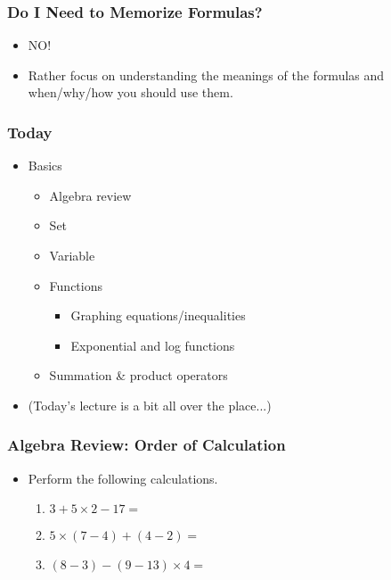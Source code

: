 \documentclass[pdflatex, 12pt]{beamer}
\begin{document}
\begin{frame}
\frametitle{Do I Need to Memorize Formulas?}
\begin{itemize}
\item NO!
\vspace{0.4cm}
\item Rather focus on understanding the meanings of the formulas and when/why/how you should use them.
\end{itemize}
\end{frame}

\begin{frame}
\frametitle{Today}
\begin{itemize}
\item Basics
 \begin{itemize}
 \item Algebra review
 \item Set
 \item Variable
 \item Functions
  \begin{itemize}
  \item Graphing equations/inequalities
  \item Exponential and log functions
  \end{itemize}
 \item Summation \& product operators
 \end{itemize}
\vspace{0.4cm}
\item (Today's lecture is a bit all over the place...)
\end{itemize}
\end{frame}

\begin{frame}
\frametitle{Algebra Review: Order of Calculation}
\begin{itemize}
\item Perform the following calculations.
 \begin{enumerate}
 \item $3 + 5 \times 2 - 17 = $
 \item $5 \times (7 - 4) + (4 - 2) = $
 \item $(8 - 3) - (9 - 13) \times 4 = $
 \end{enumerate}
\end{itemize}
\end{frame}
\end{document}

